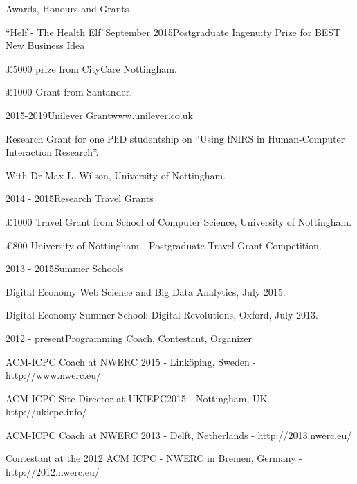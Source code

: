 \documentclass{resume} %
\begin{document}
\begin{rSection}{Awards, Honours and Grants}
    \begin{rSubsection}{``Helf - The Health Elf''}{September 2015}{Postgraduate Ingenuity Prize for BEST New Business Idea}{}
        \item \pounds 5000 prize from CityCare Nottingham.
        \item \pounds 1000 Grant from Santander.
    \end{rSubsection}

    \begin{rSubsection}{}{2015-2019}{Unilever Grant}{www.unilever.co.uk}
        \item Research Grant for one PhD studentship on ``Using fNIRS in Human-Computer Interaction Research''.
        \item With Dr Max L. Wilson, University of Nottingham.
    \end{rSubsection}

    \begin{rSubsection}{}{2014 - 2015}{Research Travel Grants}{}
        \item \pounds 1000 Travel Grant from School of Computer Science, University of Nottingham.
        \item \pounds 800 University of Nottingham - Postgraduate Travel Grant Competition.
    \end{rSubsection}
\newpage{}
    \begin{rSubsection}{}{2013 - 2015}{Summer Schools}{}
        \item Digital Economy Web Science and Big Data Analytics, July 2015.
        \item Digital Economy Summer School: Digital Revolutions, Oxford, July 2013.
    \end{rSubsection}

    \begin{rSubsection}{}{2012 - present}{Programming Coach, Contestant, Organizer}{}
        \item  ACM-ICPC Coach at NWERC 2015 - Linköping, Sweden - {http://www.nwerc.eu/}
        \item  ACM-ICPC Site Director at UKIEPC2015 - Nottingham, UK - {http://ukiepc.info/}
        \item  ACM-ICPC Coach at NWERC 2013 - Delft, Netherlands  - {http://2013.nwerc.eu/}
        \item Contestant at the 2012 ACM ICPC - NWERC in Bremen, Germany - {http://2012.nwerc.eu/}

    \end{rSubsection}

\end{rSection}
\end{document}
